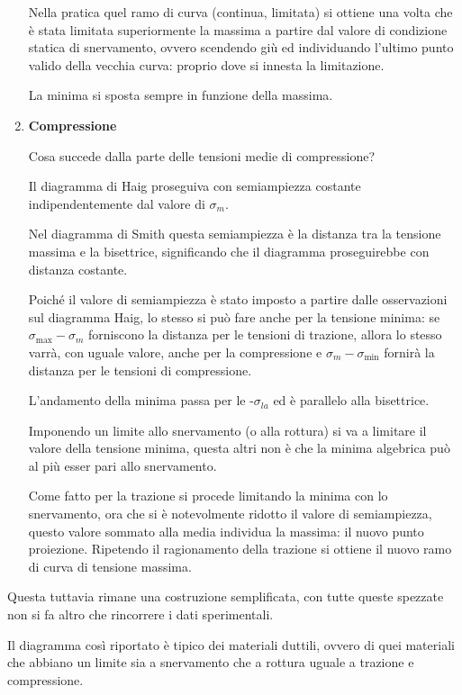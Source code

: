 \documentclass{article}
\begin{document}
\begin{adjustwidth}{2in}{}
\begin{enumerate}
				Nella pratica quel ramo di curva (continua, limitata) si ottiene una volta che è stata limitata superiormente la massima a partire dal valore di condizione statica di snervamento, ovvero scendendo giù ed individuando l'ultimo punto valido della vecchia curva: proprio dove si innesta la limitazione.
				
				La minima si sposta sempre in funzione della massima. 
\newpage				
				\item \textbf{Compressione} 
				
				Cosa succede dalla parte delle tensioni medie di compressione? 
				
				Il diagramma di Haig proseguiva con semiampiezza costante indipendentemente dal valore di $\sigma_m$.
				
				Nel diagramma di Smith questa semiampiezza è la distanza tra la tensione massima e la bisettrice, significando che il diagramma proseguirebbe con distanza costante. \newline
				
				Poiché il valore di semiampiezza è stato imposto a partire dalle osservazioni sul diagramma Haig, lo stesso si può fare anche per la tensione minima: se $\sigma_{\max} - \sigma_m$ forniscono la distanza per le tensioni di trazione, allora lo stesso varrà, con uguale valore, anche per la compressione e $\sigma_m-\sigma_{\min}$ fornirà la distanza per le tensioni di compressione. 
				
				L'andamento della minima passa per le -$\sigma_{la}$ ed è parallelo alla bisettrice. \newline
				
				Imponendo un limite allo snervamento (o alla rottura) si va a limitare il valore della tensione minima, questa altri non è che la minima algebrica può al più esser pari allo snervamento.
				
				Come fatto per la trazione si procede limitando la minima con lo snervamento, ora che si è notevolmente ridotto il valore di semiampiezza, questo valore sommato alla media individua la massima: il nuovo punto proiezione. Ripetendo il ragionamento della trazione si ottiene il nuovo ramo di curva di tensione massima.
											
			\end{enumerate}
			
			Questa tuttavia rimane una costruzione semplificata, con tutte queste spezzate non si fa altro che rincorrere i dati sperimentali.  
			
			Il diagramma così riportato è tipico dei materiali duttili, ovvero di quei materiali che abbiano un limite sia a snervamento che a rottura uguale a trazione e compressione.
			

\end{adjustwidth}
\end{document}

